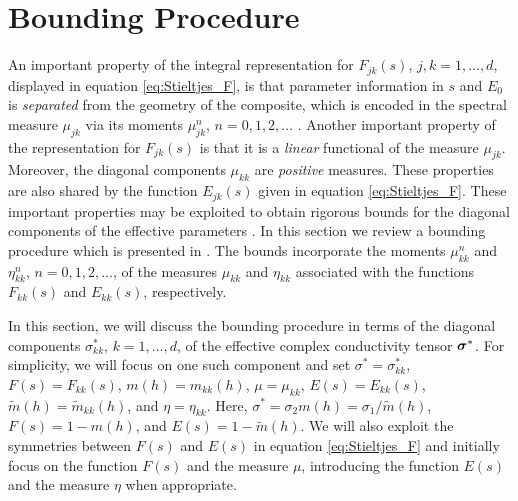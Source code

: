 \documentclass[11pt]{amsart}
\newcommand\bsig{\mbox{\boldmath${\sigma}$}}
\begin{document}
\section{Bounding Procedure}\label{sec:Bounding_Procedure}
%
An important property of the integral representation for $F_{jk}(s)$,
$j,k=1,\ldots,d$, displayed in equation \eqref{eq:Stieltjes_F},
is that parameter information in $s$
and $E_0$ is \emph{separated} from the geometry of the composite,
which is encoded in the spectral measure $\mu_{jk}$ via its moments  
$\mu^n_{jk}$, $n=0,1,2,\ldots$ \cite{Bruno:JSP-365,Golden:CMP-473}. Another
important property of the representation for $F_{jk}(s)$ is that it
is a \emph{linear} functional of the measure $\mu_{jk}$. Moreover, the
diagonal components $\mu_{kk}$ are \emph{positive} measures. These
properties are also shared by the function $E_{jk}(s)$ given in
equation \eqref{eq:Stieltjes_F}.
These important properties may be
exploited to obtain rigorous bounds for the diagonal components of the
effective parameters
\cite{Bergman:PRC-377,Bergman:PRL-1285,Milton:APL-300,Golden:CMP-473,Bergman:AP-78}. 
In this section we review a bounding procedure which is presented in 
\cite{Golden:CMP-473,Golden:1986:BCP}. The bounds incorporate the
moments $\mu_{kk}^n$ and $\eta_{kk}^n$, $n=0,1,2,\ldots$, of the measures
$\mu_{kk}$ and $\eta_{kk}$ associated with the functions $F_{kk}(s)$ and
$E_{kk}(s)$, respectively. 



 
In this section, we will discuss the bounding procedure in terms of
the diagonal components $\sigma^*_{kk}$, $k=1,\ldots,d$, of the effective
complex conductivity tensor $\bsig^*$. For
simplicity, we will focus on one such component and set
$\sigma^*=\sigma_{kk}^*$, $F(s)=F_{kk}(s)$, $m(h)=m_{kk}(h)$, $\mu=\mu_{kk}$,
$E(s)=E_{kk}(s)$, $\tilde{m}(h)=\tilde{m}_{kk}(h)$, and
$\eta=\eta_{kk}$. Here, $\sigma^*=\sigma_2m(h)=\sigma_1/\tilde{m}(h)$,
$F(s)=1-m(h)$, and $E(s)=1-\tilde{m}(h)$. We will also exploit the
symmetries between $F(s)$ and $E(s)$ in equation
\eqref{eq:Stieltjes_F} and initially focus on the function $F(s)$ and
the measure $\mu$, introducing the function $E(s)$ and the measure $\eta$
when appropriate. 
\end{document}
